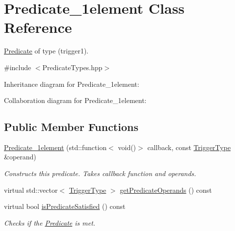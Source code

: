 \hypertarget{classPredicate__1element}{}\section{Predicate\+\_\+1element Class Reference}
\label{classPredicate__1element}


\hyperlink{classPredicate}{Predicate} of type (trigger1).  




{\ttfamily \#include $<$Predicate\+Types.\+hpp$>$}



Inheritance diagram for Predicate\+\_\+1element\+:


Collaboration diagram for Predicate\+\_\+1element\+:
\subsection*{Public Member Functions}
\begin{DoxyCompactItemize}
\item 
\hyperlink{classPredicate__1element_a1dc44523825b352e184d76877690a416}{Predicate\+\_\+1element} (std\+::function$<$ void()$>$ callback, const \hyperlink{structTriggerType}{Trigger\+Type} \&operand)\hypertarget{classPredicate__1element_a1dc44523825b352e184d76877690a416}{}\label{classPredicate__1element_a1dc44523825b352e184d76877690a416}

\begin{DoxyCompactList}\small\item\em Constructs this predicate. Takes callback function and operands. \end{DoxyCompactList}\item 
virtual std\+::vector$<$ \hyperlink{structTriggerType}{Trigger\+Type} $>$ \hyperlink{classPredicate__1element_a1a06f5afce703b5f9f08947d7ba4864d}{get\+Predicate\+Operands} () const 
\item 
virtual bool \hyperlink{classPredicate__1element_ac21e22eb6043ef9137adb8bcb1096e6b}{is\+Predicate\+Satisfied} () const \hypertarget{classPredicate__1element_ac21e22eb6043ef9137adb8bcb1096e6b}{}\label{classPredicate__1element_ac21e22eb6043ef9137adb8bcb1096e6b}

\begin{DoxyCompactList}\small\item\em Checks if the \hyperlink{classPredicate}{Predicate} is met. \end{DoxyCompactList}\end{DoxyCompactItemize}
